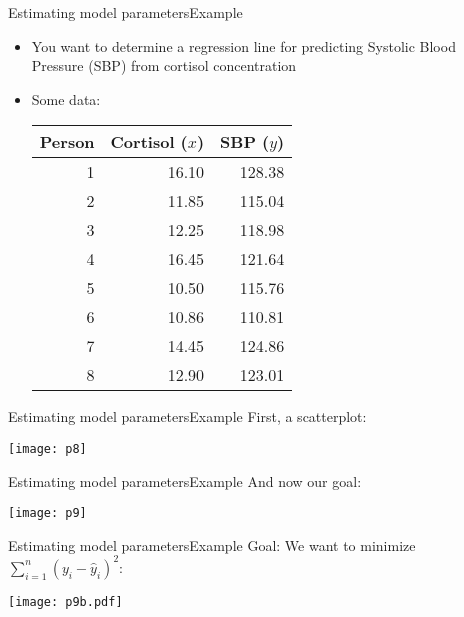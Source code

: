 \documentclass[xcolor=dvipsnames]{beamer}
\begin{document}
\begin{frame}{Estimating model parameters}{Example}
	\begin{itemize}
		\item You want to determine a regression line for predicting Systolic Blood Pressure (SBP) from cortisol concentration 
		\item Some data:
		\begin{center}
			\begin{tabular}{rrr}
				\hline
				Person& Cortisol ($x$) & SBP ($y$) \\ 
				\hline
				1 & 16.10 & 128.38 \\ 
				2 & 11.85 & 115.04 \\ 
				3 & 12.25 & 118.98 \\ 
				4 & 16.45 & 121.64 \\ 
				5 & 10.50 & 115.76 \\ 
				6 & 10.86 & 110.81 \\ 
				7 & 14.45 & 124.86 \\ 
				8 & 12.90 & 123.01 \\ 
				\hline
			\end{tabular}
		\end{center}
	\end{itemize}
\end{frame}

\begin{frame}{Estimating model parameters}{Example}
First, a scatterplot:
\begin{center}
	\texttt{[image: p8]}
\end{center}
\end{frame}

\begin{frame}{Estimating model parameters}{Example}
And now our goal:
\begin{center}
	\texttt{[image: p9]}
\end{center}
\end{frame}

\begin{frame}{Estimating model parameters}{Example}
Goal: We want to minimize $\sum_{i=1}^{n} \left(y_i - \hat{y}_i\right)^2$:
\begin{center}
	\texttt{[image: p9b.pdf]}
\end{center}
\end{frame}
\end{document}

